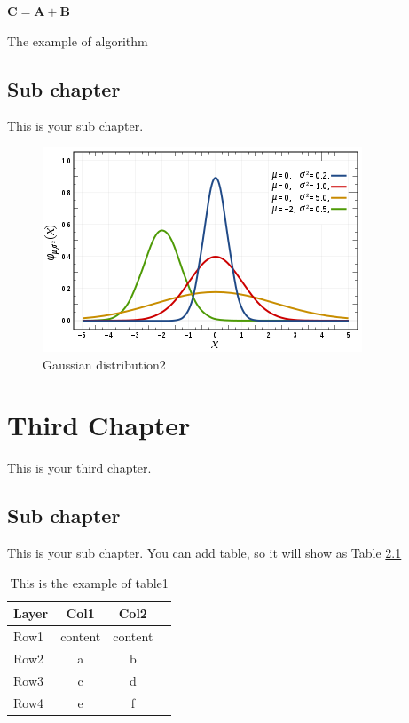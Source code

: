 \documentclass[12pt, twoside , openright]{book}
\begin{document}
\begin{algorithm}
	$\mathbf{C}=\mathbf{A}+\mathbf{B}$
	
	\caption{The example of algorithm}
\end{algorithm}


\section{Sub chapter}\label{sub_chapter22}
This is your sub chapter. \blindtext[2]
\begin{figure}[h]
	\centerline{\includegraphics[width=0.5\columnwidth]{Images/gambar.png}}
	\caption{Gaussian distribution2}
	\label{fig:figure_ref2}
\end{figure}




\chapter{Third Chapter}
This is your third chapter. \blindtext[1] 

\section{Sub chapter}\label{sub_chapter31}
This is your sub chapter. \blindtext[1] You can add table, so it will show as Table \ref{table:table1}

\begin{table}[h!]
	\begin{center}
		\caption{This is the example of table1}
		\label{table:table1}
		\begin{tabular}{|l|c|c|c|}
			\hline
			\textbf{Layer} & \textbf{Col1} & \textbf{Col2} \\ %
			\hline
			Row1 & content & content \\ %
			Row2 & a & b \\ %
			Row3 & c & d \\ %
			Row4 & e & f \\ %
			\hline
		\end{tabular}
	\end{center}
\end{table}
\end{document}
